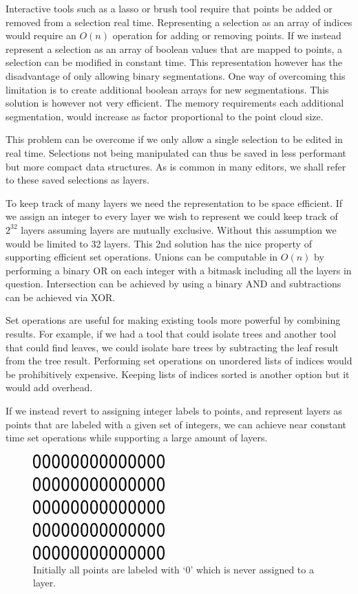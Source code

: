 Interactive tools such as a lasso or brush tool require that points be added or removed from a selection real time. Representing a selection as an array of indices would require an $O(n)$ operation for adding or removing points. If we instead represent a selection as an array of boolean values that are mapped to points, a selection can be modified in constant time. This representation however has the disadvantage of only allowing binary segmentations. One way of overcoming this limitation is to create additional boolean arrays for new segmentations. This solution is however not very efficient. The memory requirements each additional segmentation, would increase as factor proportional to the point cloud size.

This problem can be overcome if we only allow a single selection to be edited in real time. Selections not being manipulated can thus be saved in less performant but more compact data structures. As is common in many editors, we shall refer to these saved selections as layers.

To keep track of many layers we need the representation to be space efficient. If we assign an integer to every layer we wish to represent we could keep track of $2^{32}$ layers assuming layers are mutually exclusive. Without this assumption we would be limited to 32 layers. This 2nd solution has the nice property of supporting efficient set operations. Unions can be computable in $O(n)$ by performing a binary OR on each integer with a bitmask including all the layers in question. Intersection can be achieved by using a binary AND and subtractions can be achieved via XOR.

Set operations are useful for making existing tools more powerful by combining results. For example, if we had a tool that could isolate trees and another tool that could find leaves, we could isolate bare trees by subtracting the leaf result from the tree result. Performing set operations on unordered lists of indices would be prohibitively expensive. Keeping lists of indices sorted is another option but it would add overhead.

If we instead revert to assigning integer labels to points, and represent layers as points that are labeled with a given set of integers, we can achieve near constant time set operations while supporting a large amount of layers.

\begin{figure}[ht]
	\centering
	\includegraphics[width=0.45\textwidth]{images/layers1}
	\caption[Initial label state]{ Initially all points are labeled with `0' which is never assigned to a layer. \label{fig:layer1}}
\end{figure}

